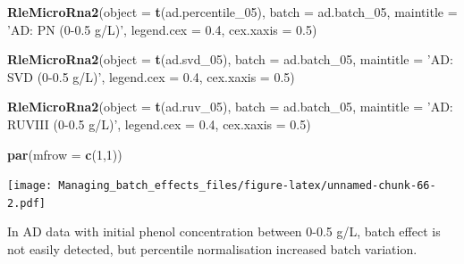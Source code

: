 \documentclass[]{book}
\newenvironment{Shaded}{\begin{snugshade}}{\end{snugshade}}
\newcommand{\KeywordTok}[1]{\textcolor[rgb]{0.13,0.29,0.53}{\textbf{#1}}}
\newcommand{\DataTypeTok}[1]{\textcolor[rgb]{0.13,0.29,0.53}{#1}}
\newcommand{\DecValTok}[1]{\textcolor[rgb]{0.00,0.00,0.81}{#1}}
\newcommand{\FloatTok}[1]{\textcolor[rgb]{0.00,0.00,0.81}{#1}}
\newcommand{\StringTok}[1]{\textcolor[rgb]{0.31,0.60,0.02}{#1}}
\newcommand{\NormalTok}[1]{#1}
\begin{document}
\begin{Shaded}
\begin{Highlighting}[]
\KeywordTok{RleMicroRna2}\NormalTok{(}\DataTypeTok{object =} \KeywordTok{t}\NormalTok{(ad.percentile_}\DecValTok{05}\NormalTok{), }\DataTypeTok{batch =}\NormalTok{ ad.batch_}\DecValTok{05}\NormalTok{, }
             \DataTypeTok{maintitle =} \StringTok{'AD: PN (0-0.5 g/L)'}\NormalTok{, }\DataTypeTok{legend.cex =} \FloatTok{0.4}\NormalTok{, }
             \DataTypeTok{cex.xaxis =} \FloatTok{0.5}\NormalTok{)}

\KeywordTok{RleMicroRna2}\NormalTok{(}\DataTypeTok{object =} \KeywordTok{t}\NormalTok{(ad.svd_}\DecValTok{05}\NormalTok{), }\DataTypeTok{batch =}\NormalTok{ ad.batch_}\DecValTok{05}\NormalTok{, }
             \DataTypeTok{maintitle =} \StringTok{'AD: SVD (0-0.5 g/L)'}\NormalTok{, }\DataTypeTok{legend.cex =} \FloatTok{0.4}\NormalTok{, }
             \DataTypeTok{cex.xaxis =} \FloatTok{0.5}\NormalTok{)}

\KeywordTok{RleMicroRna2}\NormalTok{(}\DataTypeTok{object =} \KeywordTok{t}\NormalTok{(ad.ruv_}\DecValTok{05}\NormalTok{), }\DataTypeTok{batch =}\NormalTok{ ad.batch_}\DecValTok{05}\NormalTok{, }
             \DataTypeTok{maintitle =} \StringTok{'AD: RUVIII (0-0.5 g/L)'}\NormalTok{, }\DataTypeTok{legend.cex =} \FloatTok{0.4}\NormalTok{, }
             \DataTypeTok{cex.xaxis =} \FloatTok{0.5}\NormalTok{)}

\KeywordTok{par}\NormalTok{(}\DataTypeTok{mfrow =} \KeywordTok{c}\NormalTok{(}\DecValTok{1}\NormalTok{,}\DecValTok{1}\NormalTok{))}
\end{Highlighting}
\end{Shaded}

\texttt{[image: Managing\_batch\_effects\_files/figure-latex/unnamed-chunk-66-2.pdf]}

In AD data with initial phenol concentration between 0-0.5 g/L, batch
effect is not easily detected, but percentile normalisation increased
batch variation.
\end{document}
